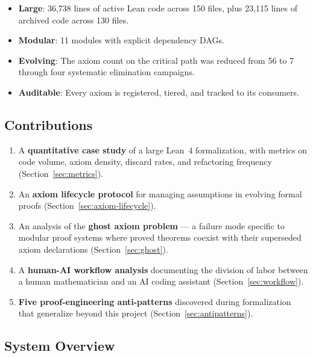 \documentclass[11pt,a4paper]{article}
\begin{document}
\begin{itemize}
  \item \textbf{Large}: 36,738 lines of active Lean code across 150 files,
    plus 23,115 lines of archived code across 130 files.
  \item \textbf{Modular}: 11 modules with explicit dependency DAGs.
  \item \textbf{Evolving}: The axiom count on the critical path was
    reduced from 56 to 7 through four systematic elimination campaigns.
  \item \textbf{Auditable}: Every axiom is registered, tiered, and tracked
    to its consumers.
\end{itemize}

\subsection{Contributions}

\begin{enumerate}
  \item A \textbf{quantitative case study} of a large Lean~4 formalization,
    with metrics on code volume, axiom density, discard rates, and
    refactoring frequency (Section~\ref{sec:metrics}).
  \item An \textbf{axiom lifecycle protocol} for managing assumptions
    in evolving formal proofs (Section~\ref{sec:axiom-lifecycle}).
  \item An analysis of the \textbf{ghost axiom problem} --- a failure
    mode specific to modular proof systems where proved theorems
    coexist with their superseded axiom declarations
    (Section~\ref{sec:ghost}).
  \item A \textbf{human-AI workflow analysis} documenting the division
    of labor between a human mathematician and an AI coding assistant
    (Section~\ref{sec:workflow}).
  \item \textbf{Five proof-engineering anti-patterns} discovered during
    formalization that generalize beyond this project
    (Section~\ref{sec:antipatterns}).
\end{enumerate}

\subsection{System Overview}
\end{document}

